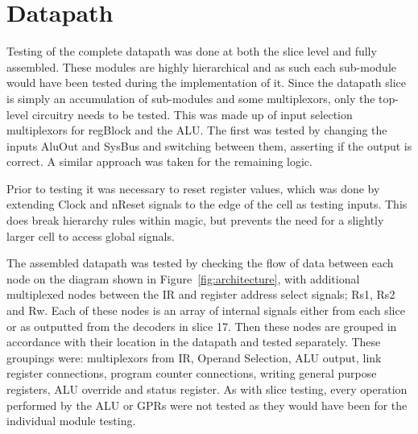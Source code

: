 
\section{Datapath}



Testing of the complete datapath was done at both the slice level and fully assembled. These modules are highly hierarchical and as such each sub-module would have been tested during the implementation of it. Since the datapath slice is simply an accumulation of sub-modules and some multiplexors, only the top-level circuitry needs to be tested. This was made up of input selection multiplexors for regBlock and the ALU. The first was tested by changing the inputs AluOut and SysBus and switching between them, asserting if the output is correct. A similar approach was taken for the remaining logic.

Prior to testing it was necessary to reset register values, which was done by extending Clock and nReset signals to the edge of the cell as testing inputs. This does break hierarchy rules within magic, but prevents the need for a slightly larger cell to access global signals. 

The assembled datapath was tested by checking the flow of data between each node on the diagram shown in Figure~\ref{fig:architecture}, with additional multiplexed nodes between the IR and register address select signals; Rs1, Rs2 and Rw. Each of these nodes is an array of internal signals either from each slice or as outputted from the decoders in slice 17. Then these nodes are grouped in accordance with their location in the datapath and tested separately. These groupings were: multiplexors from IR, Operand Selection, ALU output, link register connections, program counter connections, writing general purpose registers, ALU override and status register. As with slice testing, every operation performed by the ALU or GPRs were not tested as they would have been for the individual module testing. 